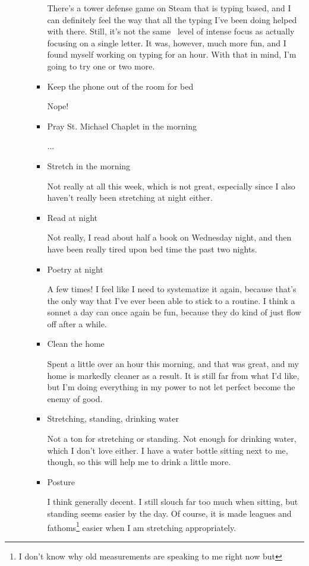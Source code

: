 \documentclass[12pt]{article}
\renewcommand{\,}{\textsuperscript{,}}
\begin{document}
\begin{itemize}
\begin{itemize}
\begin{itemize}
There's a tower defense game on Steam that is typing based, and I can definitely feel the way that all the typing I've been doing helped with there. Still, it's not the same  level of intense focus as actually focusing on a single letter.  
It was, however, much more fun, and I found myself working on typing for an hour.  
With that in mind, I'm going to try one or two more.

\item Keep the phone out of the room for bed

Nope!

\item Pray St. Michael Chaplet in the morning

...

\item Stretch in the morning

Not really at all this week, which is not great, especially since I also haven't really been stretching at night either.

\item Read at night

Not really, I read about half a book on Wednesday night, and then have been really tired upon bed time the past two nights.

\item Poetry at night

A few times! I feel like I need to systematize it again, because that's the only way that I've ever been able to stick to a routine. I think a sonnet a day can once again be fun, because they do kind of just flow off after a while.

\item Clean the home

Spent a little over an hour this morning, and that was great, and my home is markedly cleaner as a result.  
It is still far from what I'd like, but I'm doing everything in my power to not let perfect become the enemy of good.

\item Stretching, standing, drinking water

Not a ton for stretching or standing.  
Not enough for drinking water, which I don't love either.  
I have a water bottle sitting next to me, though, so this will help me to drink a little more.

\item Posture

I think generally decent.  
I still slouch far too much when sitting, but standing seems easier by the day.  
Of course, it is made leagues and fathoms\footnote{I don't know why old measurements are speaking to me right now but} easier when I am stretching appropriately.


\end{itemize}
\end{itemize}
\end{itemize}
\end{document}
